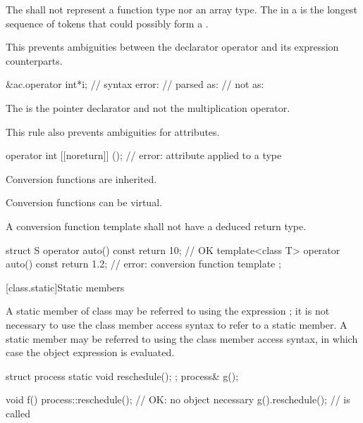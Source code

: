 \pnum
The
shall not represent a function type nor an array type.
The
in a
is the longest sequence of
tokens that could possibly form a .
\begin{note}
This prevents ambiguities between the declarator operator \tcode{*} and its expression
counterparts.
\begin{example}
\begin{codeblock}
&ac.operator int*i; // syntax error:
                    // parsed as: 
                    // not as: 
\end{codeblock}
The \tcode{*} is the pointer declarator and not the multiplication operator.
\end{example}
This rule also prevents ambiguities for attributes.
\begin{example}
\begin{codeblock}
operator int [[noreturn]] ();   // error:  attribute applied to a type
\end{codeblock}
\end{example}
\end{note}

\pnum
{}%
Conversion functions are inherited.

\pnum
{}%
Conversion functions can be virtual.

\pnum
{}%
A conversion function template shall not have a
deduced return type.
\begin{example}
\begin{codeblock}
struct S {
  operator auto() const { return 10; }      // OK
  template<class T>
  operator auto() const { return 1.2; }     // error: conversion function template
};
\end{codeblock}
\end{example}

[class.static]{Static members}%
%

\pnum
A static member  of class  may be referred to
using the  expression ; it is not
necessary to use the class member access syntax to
refer to a static member. A static member may be
referred to using the class member access syntax, in which case the
object expression is evaluated.
\begin{example}

\begin{codeblock}
struct process {
  static void reschedule();
};
process& g();

void f() {
  process::reschedule();        // OK: no object necessary
  g().reschedule();             //  is called
}
\end{codeblock}
\end{example}

